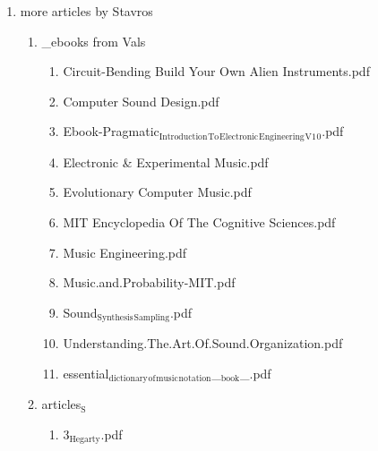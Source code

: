 \documentclass[11pt]{article}
\begin{document}
\begin{enumerate}
\item more articles by Stavros
\label{sec-1-1-1-1-11-19-20-20}
\begin{enumerate}
\item \_ebooks from Vals
\label{sec-1-1-1-1-11-19-20-20-1}
\begin{enumerate}
\item Circuit-Bending Build Your Own Alien Instruments.pdf
\label{sec-1-1-1-1-11-19-20-20-1-1}

\item Computer Sound Design.pdf
\label{sec-1-1-1-1-11-19-20-20-1-2}

\item Ebook-Pragmatic$_{\text{Introduction}}$$_{\text{To}}$$_{\text{Electronic}}$$_{\text{Engineering}}$$_{\text{V1}}$$_{\text{0}}$.pdf
\label{sec-1-1-1-1-11-19-20-20-1-3}

\item Electronic \& Experimental Music.pdf
\label{sec-1-1-1-1-11-19-20-20-1-4}

\item Evolutionary Computer Music.pdf
\label{sec-1-1-1-1-11-19-20-20-1-5}

\item MIT Encyclopedia Of The Cognitive Sciences.pdf
\label{sec-1-1-1-1-11-19-20-20-1-6}

\item Music Engineering.pdf
\label{sec-1-1-1-1-11-19-20-20-1-7}

\item Music.and.Probability-ΜΙΤ.pdf
\label{sec-1-1-1-1-11-19-20-20-1-8}

\item Sound$_{\text{Synthesis}}$$_{\text{Sampling}}$.pdf
\label{sec-1-1-1-1-11-19-20-20-1-9}

\item Understanding.The.Art.Of.Sound.Organization.pdf
\label{sec-1-1-1-1-11-19-20-20-1-10}

\item essential$_{\text{dictionary}}$$_{\text{of}}$$_{\text{music}}$$_{\text{notation}}$\_$_{\text{book}}$\_.pdf
\label{sec-1-1-1-1-11-19-20-20-1-11}
\end{enumerate}

\item articles$_{\text{S}}$
\label{sec-1-1-1-1-11-19-20-20-2}
\begin{enumerate}
\item 3$_{\text{Hegarty}}$.pdf
\label{sec-1-1-1-1-11-19-20-20-2-1}


\end{enumerate}
\end{enumerate}
\end{enumerate}
\end{document}
